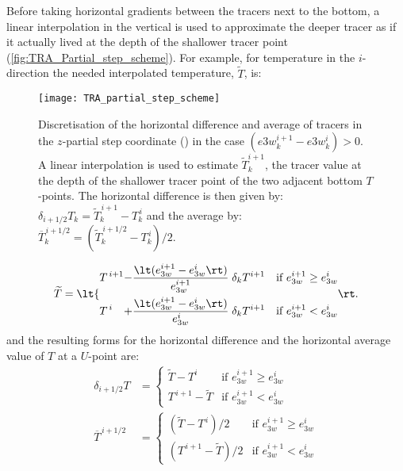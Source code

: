 \documentclass[../main/NEMO_manual]{subfiles}
\begin{document}
Before taking horizontal gradients between the tracers next to the bottom,
a linear interpolation in the vertical is used to approximate the deeper tracer as if
it actually lived at the depth of the shallower tracer point (\autoref{fig:TRA_Partial_step_scheme}).
For example, for temperature in the $i$-direction the needed interpolated temperature,
$\widetilde T$, is:

\begin{figure}
  \centering
  \texttt{[image: TRA\_partial\_step\_scheme]}
  \caption[Discretisation of the horizontal difference and average of tracers in
  the $z$-partial step coordinate]{
    Discretisation of the horizontal difference and average of tracers in
    the $z$-partial step coordinate (\protect{}) in
    the case $(e3w_k^{i + 1} - e3w_k^i) > 0$.
    A linear interpolation is used to estimate $\widetilde T_k^{i + 1}$,
    the tracer value at the depth of the shallower tracer point of the two adjacent bottom $T$-points.
    The horizontal difference is then given by:
    $\delta_{i + 1/2} T_k = \widetilde T_k^{\, i + 1} -T_k^{\, i}$ and the average by:
    $\overline T_k^{\, i + 1/2} = (\widetilde T_k^{\, i + 1/2} - T_k^{\, i}) / 2$.}
  \label{fig:TRA_Partial_step_scheme}
\end{figure}

\[
  \widetilde T = \lt\{
    \begin{alignedat}{2}
      &T^{\, i + 1} &-\frac{ \lt( e_{3w}^{i + 1} -e_{3w}^i \rt) }{ e_{3w}^{i + 1} } \; \delta_k T^{i + 1}
      & \quad \text{if $e_{3w}^{i + 1} \geq e_{3w}^i$} \\
      &T^{\, i}     &+\frac{ \lt( e_{3w}^{i + 1} -e_{3w}^i \rt )}{e_{3w}^i       } \; \delta_k T^{i + 1}
      & \quad \text{if $e_{3w}^{i + 1} <    e_{3w}^i$}
    \end{alignedat}
  \rt.
\]
and the resulting forms for the horizontal difference and the horizontal average value of
$T$ at a $U$-point are:
\begin{equation}
  \label{eq:TRA_zps_hde}
  \begin{split}
    \delta_{i + 1/2} T       &=
    \begin{cases}
      \widetilde T - T^i          & \text{if~} e_{3w}^{i + 1} \geq e_{3w}^i \\
      T^{\, i + 1} - \widetilde T & \text{if~} e_{3w}^{i + 1} <    e_{3w}^i
    \end{cases} \\
    \overline T^{\, i + 1/2} &=
    \begin{cases}
      (\widetilde T - T^{\, i}    ) / 2 & \text{if~} e_{3w}^{i + 1} \geq e_{3w}^i \\
      (T^{\, i + 1} - \widetilde T) / 2 & \text{if~} e_{3w}^{i + 1} <   e_{3w}^i
    \end{cases}
  \end{split}
\end{equation}
\end{document}
